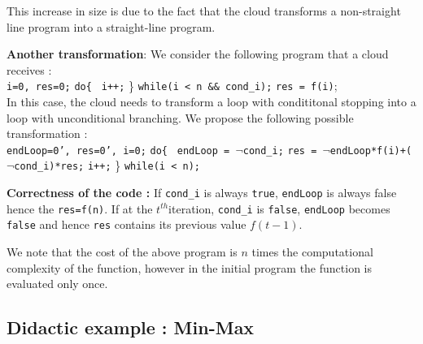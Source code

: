 \documentclass{acm_proc_article-sp}
\begin{document}
This increase in size is due to the fact that the cloud transforms a non-straight line program into a straight-line program.

\textbf{Another transformation}: We consider the following program that a cloud receives : \\
 \phantom{x} \texttt{i=0, res=0;}
\newline \phantom{x} \texttt{do\{ }
\newline \phantom{x} \hspace{9ex} \texttt{i++;} 
\newline   \phantom{x} \} \texttt{while(i < n \&\& cond\_i);} 
\newline  \phantom{x} \texttt{res = f(i)};\\
In this case, the cloud needs to transform a loop with condititonal stopping into a loop with unconditional branching. We propose the following possible transformation : \\
 \phantom{x} \texttt{endLoop=0', res=0', i=0;}
\newline \phantom{x} \texttt{do\{ }
\newline \phantom{x} \hspace{6ex} \texttt{endLoop = $\neg$cond\_i;}
\newline \phantom{x} \hspace{6ex} \texttt{res = $\neg$endLoop*f(i)+($\neg$cond\_i)*res;}
\newline \phantom{x} \hspace{6ex} \texttt{i++;} 
\newline   \phantom{x} \} \texttt{while(i < n);} 

\textbf{Correctness of the code :} If \texttt{cond\_i} is always \texttt{true}, \texttt{endLoop} is always false hence the \texttt{res=f(n)}. If at the $t^{th}$iteration, \texttt{cond\_i} is \texttt{false}, \texttt{endLoop} becomes \texttt{false} and hence \texttt{res} contains its previous value $f(t-1)$. 

We note that the cost of the above program is $n$ times the computational complexity of the function, however in the initial program the function is evaluated only once.

\subsection{ Didactic example :  Min-Max}
\label{sec:ex}
\end{document}
